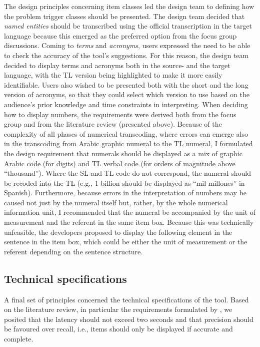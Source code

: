 The design principles concerning item classes led the design team to defining how the problem trigger classes should be presented. The design team decided that \textit{named entities} should be transcribed using the official transcription in the target language because this emerged as the preferred option from the focus group discussions. Coming to \textit{terms} and \textit{acronyms}, users expressed the need to be able to check the accuracy of the tool’s suggestions. For this reason, the design team decided to display terms and acronyms both in the source- and the target language, with the TL version being highlighted to make it more easily identifiable. Users also wished to be presented both with the short and the long version of acronyms, so that they could select which version to use based on the audience’s prior knowledge and time constraints in interpreting. When deciding how to display numbers, the requirements were derived both from the focus group and from the literature review (presented above). Because of the complexity of all phases of numerical transcoding, where errors can emerge also in the transcoding from Arabic graphic numeral to the TL numeral, I formulated the design requirement that numerals should be displayed as a mix of graphic Arabic code (for digits) and TL verbal code (for orders of magnitude above “thousand”). Where the SL and TL code do not correspond, the numeral should be recoded into the TL (e.g., 1 billion should be displayed as “mil millones” in Spanish). Furthermore, because errors in the interpretation of numbers may be caused not just by the numeral itself but, rather, by the whole numerical information unit, I recommended that the numeral be accompanied by the unit of measurement and the referent in the same item box. Because this was technically unfeasible, the developers proposed to display the following element in the sentence in the item box, which could be either the unit of measurement or the referent depending on the sentence structure.

\subsection{Technical specifications}

A final set of principles concerned the technical specifications of the tool. Based on the literature review, in particular the requirements formulated by \citet{fantinuoli2017speech}, we posited that the latency should not exceed two seconds and that precision should be favoured over recall, i.e., items should only be displayed if accurate and complete.



